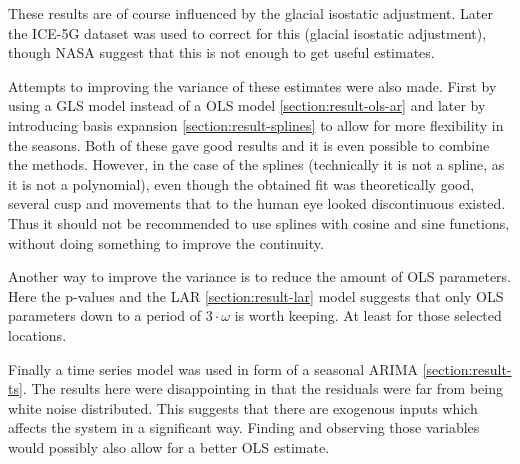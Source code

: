 These results are of course influenced by the glacial isostatic adjustment. Later the ICE-5G dataset was used to correct for this (glacial isostatic adjustment), though NASA suggest  \cite{NASA-GIA-incomplete} that this is not enough to get useful estimates.

Attempts to improving the variance of these estimates were also made. First by using a GLS model instead of a OLS model \ref{section:result-ols-ar} and later by introducing basis expansion \ref{section:result-splines} to allow for more flexibility in the seasons. Both of these gave good results and it is even possible to combine the methods. However, in the case of the splines (technically it is not a spline, as it is not a polynomial), even though the obtained fit was theoretically good, several cusp and movements that to the human eye looked discontinuous existed. Thus it should not be recommended to use splines with cosine and sine functions, without doing something to improve the continuity.

Another way to improve the variance is to reduce the amount of OLS parameters. Here the p-values and the LAR \ref{section:result-lar} model suggests that only OLS parameters down to a period of $3 \cdot \omega$ is worth keeping. At least for those selected locations.

Finally a time series model was used in form of a seasonal ARIMA \ref{section:result-ts}. The results here were disappointing in that the residuals were far from being white noise distributed. This suggests that there are exogenous inputs which affects the system in a significant way. Finding and observing those variables would possibly also allow for a better OLS estimate. 
